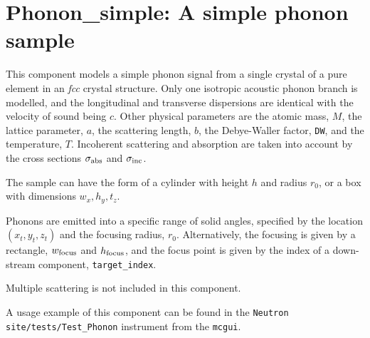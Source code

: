 \section{Phonon\_simple: A simple phonon sample}
\label{s:phonon_simple}


This component models a simple phonon signal from a single crystal of
a pure element in an {\em fcc} crystal structure.
Only one isotropic acoustic phonon branch is modelled, and the longitudinal
and transverse dispersions are identical with the velocity of sound being $c$.
Other physical parameters are the atomic mass, $M$, the lattice parameter, $a$,
the scattering length, $b$,
the Debye-Waller factor, \verb+DW+, and the temperature, $T$.
Incoherent scattering and absorption are taken into account by the cross
sections $\sigma_{\rm abs}$ and $\sigma_{\rm inc}$.

The sample can have the form of a cylinder with height $h$ and radius
$r_0$, or a box with dimensions $w_x, h_y, t_z$.

Phonons are emitted into a specific range of solid angles, specified
by the location $(x_t, y_t, z_t)$ and the focusing radius, $r_0$.
Alternatively, the focusing is given by a rectangle,
$w_{\rm focus}$ and $h_{\rm focus}$, and the focus point is given by the
index of a down-stream component, \verb+target_index+.

Multiple scattering is not included in this component.

A usage example of this component can be found in the \verb+Neutron site/tests/Test_Phonon+ instrument from the \verb+mcgui+.

